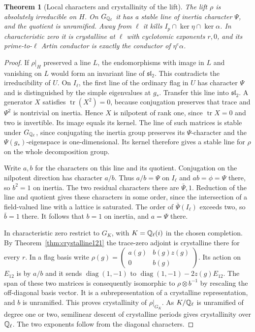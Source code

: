 \documentclass[a4paper,11pt]{article}
\newtheorem{theorem}[proposition]{Theorem}
\theoremstyle{definition}
\theoremstyle{remark}
\numberwithin{equation}{section}
\begin{document}
\begin{theorem}[Local characters and crystallinity of the lift]
\label{thm:local122}
The lift \(\rho\) is absolutely irreducible on \(H\).
On \(G_{\mathbb Q_\ell}\) it has a stable line of inertia character
\(\Psi\), and the quotient is unramified. Away from \(\ell\)
it kills \(I_p\cap\ker\eta\cap\ker\alpha\). In characteristic
zero it is crystalline at \(\ell\) with cyclotomic exponents
\(r,0\), and its prime-to-\(\ell\) Artin conductor is exactly
the conductor of \(\eta^e\alpha\).
\end{theorem}
\begin{proof}
If \(\rho|_H\) preserved a line \(L\), the endomorphisms
with image in \(L\) and vanishing on \(L\) would form an
invariant line of \(\mathfrak{sl}_2\). This contradicts the
irreducibility of \(U\).
On \(I_\ell\), the first line of the ordinary flag in \(U\)
has character \(\Psi\) and is distinguished by the simple
eigenvalues at \(g_*\). Transfer this line into
\(\mathfrak{sl}_2\). A generator \(X\) satisfies
\(\operatorname{tr}(X^2)=0\), because conjugation preserves
that trace and \(\Psi^2\) is nontrivial on inertia. Hence
\(X\) is nilpotent of rank one, since
\(\operatorname{tr}X=0\) and two is invertible. Its image
equals its kernel. The line of such matrices is stable
under \(G_{\mathbb Q_\ell}\), since conjugating the inertia group
preserves its \(\Psi\)-character and the \(\Psi(g_*)\)-eigenspace
is one-dimensional. Its kernel therefore gives a stable line
for \(\rho\) on the whole decomposition group.

Write \(a,b\) for the characters on this line and its quotient.
Conjugation on the nilpotent direction has character \(a/b\).
Thus \(a/b=\Psi\) on \(I_\ell\) and \(ab=\phi=\Psi\) there,
so \(b^2=1\) on inertia. The two residual characters there
are \(\bar\Psi,1\). Reduction of the line and quotient
gives these characters in some order, since the intersection
of a field-valued line with a lattice is saturated. The order
of \(\bar\Psi(I_\ell)\) exceeds two, so \(\bar b=1\) there.
It follows that \(b=1\) on inertia, and \(a=\Psi\) there.

In characteristic zero restrict to \(G_K\), with
\(K=\mathbb Q_\ell(i)\) in the chosen completion. By
Theorem~\ref{thm:crystalline121} the trace-zero adjoint is
crystalline there for every \(r\). In a flag basis write
\(\rho(g)=\left(\begin{smallmatrix}a(g)&b(g)z(g)\\0&b(g)\end{smallmatrix}\right)\).
Its action on \(E_{12}\) is by \(a/b\) and it sends
\(\operatorname{diag}(1,-1)\) to
\(\operatorname{diag}(1,-1)-2z(g)E_{12}\). The span of these
two matrices is consequently isomorphic to \(\rho\otimes b^{-1}\)
by rescaling the off-diagonal basis vector. It is a subrepresentation
of a crystalline representation, and \(b\) is unramified.
This proves crystallinity of \(\rho|_{G_K}\). As \(K/\mathbb Q_\ell\)
is unramified of degree one or two, semilinear descent of
crystalline periods gives crystallinity over \(\mathbb Q_\ell\).
The two exponents follow from the diagonal characters.


\end{proof}
\end{document}
